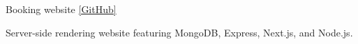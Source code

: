 \begin{cventries}
  \projectentry
    {}
    {Booking website \href{https://github.com/bookmountain/book-it-app-nextjs-mongodb}{\footnotesize\color{ao}[GitHub]}} %
{}
{}
    {
      \begin{cvitems} %
        \item {Server-side rendering website featuring MongoDB, Express, Next.js, and Node.js.}
      \end{cvitems}
    }
\end{cventries}